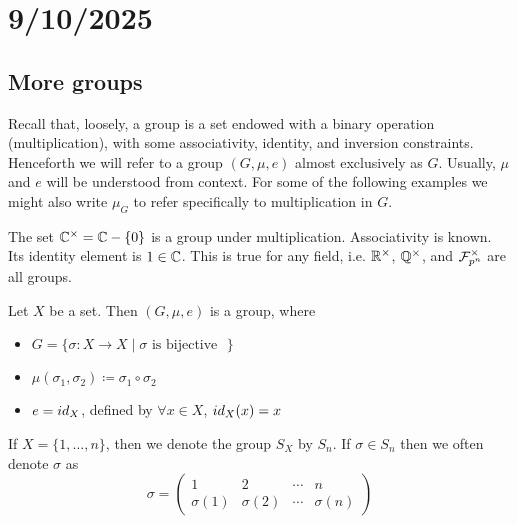 \section{9/10/2025}

\subsection{More groups}
Recall that, loosely, a group is a set endowed with a binary operation (multiplication), 
with some associativity, identity, and inversion constraints.
Henceforth we will refer to a group $(G,\mu,e)$ almost exclusively as $G$.
Usually, $\mu$ and $e$ will be understood from context.
For some of the following examples we might also write 
$\mu_G$ to refer specifically to multiplication in $G$.




\begin{example}
    The set $\mathbb{C}^\times = \mathbb{C}-\{0\}$ is a group under multiplication.
    Associativity is known.
    Its identity element is $1\in\mathbb{C}$.
    This is true for any field, i.e. $\mathbb{R}^\times$, $\mathbb{Q}^\times$, and $\mathcal{F}_{p^n}^\times$
    are all groups.
\end{example}



\begin{example}
    Let $X$ be a set. Then $(G,\mu,e)$ is a group, where
    \begin{itemize}
        \item $G = \{ \text{$\sigma:X\to X \mid \text{$\sigma$ is bijective}$ } \}$ %
        \item $\mu(\sigma_1,\sigma_2) \coloneq \sigma_1\circ\sigma_2$
        \item $e = id_X$, defined by $\forall x\in X$, $id_X(x) = x$
    \end{itemize}
\end{example}

\begin{example}
    If $X=\{1,\dots,n\}$, then we denote the group $S_X$ by $S_n$.
    If $\sigma\in S_n$ then we often denote $\sigma$ as 
    \[
        \sigma = \begin{pmatrix}
            1 & 2 & \cdots & n \\
            \sigma(1) & \sigma(2) & \cdots & \sigma(n)
        \end{pmatrix}
    \]
\end{example}




